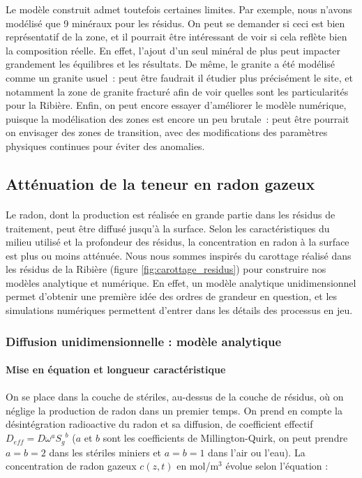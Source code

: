 \documentclass{article}
\begin{document}
Le modèle construit admet toutefois certaines limites. Par exemple, nous n’avons modélisé que 9 minéraux pour les résidus. On peut se demander si ceci est bien représentatif de la zone, et il pourrait être intéressant de voir si cela reflète bien la composition réelle. En effet, l’ajout d’un seul minéral de plus peut impacter grandement les équilibres et les résultats. De même, le granite a été modélisé comme un granite usuel : peut être faudrait il étudier plus précisément le site, et notamment la zone de granite fracturé afin de voir quelles sont les particularités pour la Ribière. Enfin, on peut encore essayer d’améliorer le modèle numérique, puisque la modélisation des zones est encore un peu brutale : peut être pourrait on envisager des zones de transition, avec des modifications des paramètres physiques continues pour éviter des anomalies.

\newpage
\subsection{Atténuation de la teneur en radon gazeux}

\paragraph{} Le radon, dont la production est réalisée en grande partie dans les résidus de traitement, peut être diffusé jusqu’à la surface. Selon les caractéristiques du milieu utilisé et la profondeur des résidus, la concentration en radon à la surface est plus ou moins atténuée. Nous nous sommes inspirés du carottage réalisé dans les résidus de la Ribière (figure \ref{fig:carottage_residus}) pour construire nos modèles analytique et numérique. En effet, un modèle analytique unidimensionnel permet d’obtenir une première idée des ordres de grandeur en question, et les simulations numériques permettent d'entrer dans les détails des processus en jeu.

\subsubsection{Diffusion unidimensionnelle : modèle analytique}

\paragraph{Mise en équation et longueur caractéristique}

\paragraph{} On se place dans la couche de stériles, au-dessus de la couche de résidus, où on néglige la production de radon dans un premier temps. On prend en compte la désintégration radioactive du radon et sa diffusion, de coefficient effectif $D_{eff}=D \omega^a {S_g}^b$ ($a$ et $b$ sont les coefficients de Millington-Quirk, on peut prendre $a=b=2$ dans les stériles miniers et $a=b=1$ dans l’air ou l’eau). La concentration de radon gazeux $c(z,t)$ en mol/m$^3$ évolue selon l’équation \cite{ferry_migration_2000} :
\end{document}
